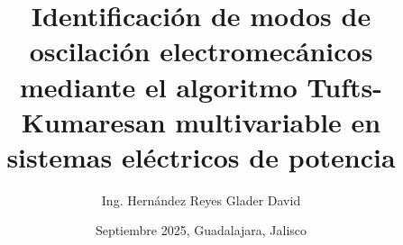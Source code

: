 \documentclass[letterpaper,12pt,twoside,openright,notitlepage,final]{UDG_thesis}
\title{Identificación de modos de oscilación electromecánicos mediante el algoritmo
Tufts-Kumaresan multivariable en sistemas eléctricos de potencia}
\author{Ing. Hernández Reyes Glader David}
\date{Septiembre 2025, Guadalajara, Jalisco}
\begin{document}
	
 
\graphicspath{{./Capitulos/Figuras/}}	%
\maketitle  
{}            %
\end{document}
